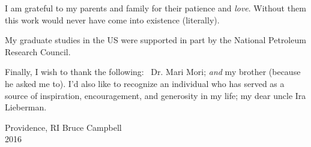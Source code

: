 \def\baselinestretch{1.0}
 I am grateful to my parents and family for their
patience and {\em love}. Without them this work would never have come into
existence (literally).

My graduate studies in the US were supported in part by the National
Petroleum Research Council.

\medskip
Finally, I wish to thank the following: \,  Dr. Mari Mori; {\em and } my
brother (because he asked me to).   I'd also like to recognize an individual
who has served as a source of inspiration, encouragement, and generosity in
my life; my dear uncle Ira Lieberman.

\bigskip\medskip

\noindent Providence, RI \hfill Bruce Campbell\\
2016

